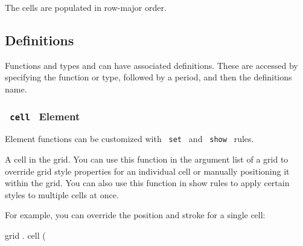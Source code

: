 The cells are populated in row-major order.

\subsection{\texorpdfstring{{ Definitions
}}{ Definitions }}\label{definitions}

\label{definitions-tooltip}
Functions and types and can have associated definitions. These are
accessed by specifying the function or type, followed by a period, and
then the definition\textquotesingle s name.

\subsubsection{\texorpdfstring{\texttt{\ cell\ } {{ Element
}}}{ cell   Element }}\label{definitions-cell}

\label{definitions-cell-element-tooltip}
Element functions can be customized with \texttt{\ set\ } and
\texttt{\ show\ } rules.

A cell in the grid. You can use this function in the argument list of a
grid to override grid style properties for an individual cell or
manually positioning it within the grid. You can also use this function
in show rules to apply certain styles to multiple cells at once.

For example, you can override the position and stroke for a single cell:

grid { . } { cell } (

